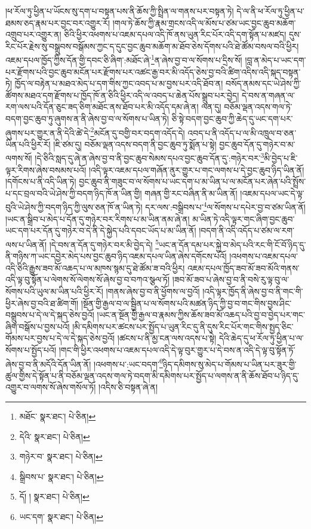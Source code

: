 །ཕ་རོལ་ཏུ་ཕྱིན་པ་ཡོངས་སུ་དག་པ་བསྟན་པས་ནི་ཆོས་ཀྱི་སྤྲིན་ལ་གནས་པར་བསྟན་ཏེ། དེ་ལ་ནི་ཕ་རོལ་ཏུ་ཕྱིན་པ་ཐམས་ཅད་རྣམ་པར་བྱང་བར་འགྱུར་རོ། །གལ་ཏེ་ཆོས་ཀྱི་རྣམ་གྲངས་འདི་ལ་མོས་པ་ཙམ་ཡང་བྱང་ཆུབ་མཆོག་འགྲུབ་པར་འགྱུར་ན། ཅིའི་ཕྱིར་འཕགས་པ་འཇམ་དཔལ་འདི་ཁོ་ནས་ཡུན་རིང་པོར་འདི་དག་སྟོན་པ་མཛད། དུས་རིང་པོར་རྗེས་སུ་བསྒྲུབས་བསྒོམས་ཀྱང་ད་དུང་བྱང་ཆུབ་མཆོག་མ་ཐོབ་ཅེས་དོགས་པའི་ཐེ་ཚོམ་བསལ་བའི་ཕྱིར། འཇམ་དཔལ་ཁྱོད་ཀྱིས་དོན་གྱི་དབང་ཅི་ཞིག་:མཐོང་ཞེ་\footnote{མཐོང་  སྣར་ཐང་།  པེ་ཅིན། }ན་ཞེས་བྱ་བ་ལ་སོགས་པ་དྲིས་སོ། །བླ་ན་མེད་པ་ཡང་དག་པར་རྫོགས་པའི་བྱང་ཆུབ་མངོན་པར་རྫོགས་པར་འཚང་རྒྱ་བར་མི་འདོད་ཅེས་བྱ་བའི་ཚིག་འདིས་འདི་སྐད་བསྟན་ཏེ། ཁྱོད་ལ་བརྟེན་པ་མཐའ་མེད་པ་དག་གིས་ཀྱང་འབད་པ་མ་བྱས་པར་འདི་ཐོབ་ན། བསོད་ནམས་དང་ཡེ་ཤེས་ཀྱི་ཚོགས་མཐའ་དག་རྫོགས་པ་ཁྱོད་ཁོ་ན་ཅིའི་ཕྱིར་འདི་ལ་འབད་པ་ཆེན་པོས་སྒྲུབ་པར་བྱེད། དེ་བས་ན་གཞན་ལ་རག་ལས་པའི་དོན་ཅུང་ཟད་ཅིག་མཐོང་ནས་ཐོབ་པར་མི་འདོད་དམ་ཞེ་ན། ལན་དུ། བཅོམ་ལྡན་འདས་གལ་ཏེ་བདག་བྱང་ཆུབ་ཏུ་ཞུགས་ན་ནི་ཞེས་བྱ་བ་ལ་སོགས་པ་ཡིན་ཏེ། ཅི་སྟེ་བདག་བྱང་ཆུབ་ཀྱི་ཆེད་དུ་ཡང་དག་པར་ཞུགས་པར་གྱུར་ན་ནི་དེའི་ཚེ་དེ་\footnote{དེའི་  སྣར་ཐང་།  པེ་ཅིན། }མངོན་དུ་བགྱི་བར་བདག་འདོད་དེ། འབད་པ་ནི་འདོད་པ་ལ་མི་འཁྲུལ་བ་ཅན་ཡིན་པའི་ཕྱིར་རོ། །ཇི་ཙམ་དུ། བཅོམ་ལྡན་འདས་བདག་ནི་བྱང་ཆུབ་ཏུ་སྨོན་པ་སྟེ། བྱང་ཆུབ་དོན་དུ་གཉེར་བ་མ་ལགས་སོ། །དེ་ཅིའི་སླད་དུ་ཞེ་ན་ཞེས་བྱ་བ་ནི་བྱང་ཆུབ་སེམས་དཔའ་བྱང་ཆུབ་དོན་དུ་:གཉེར་བར་\footnote{གཉེར་བ་  སྣར་ཐང་།  པེ་ཅིན། }མི་བྱེད་པ་ཇི་ལྟར་རིགས་ཞེས་བསམས་པའོ། །འདི་ལྟར་འཇམ་དཔལ་གཞོན་ནུར་གྱུར་པ་གང་ལགས་པ་དེ་བྱང་ཆུབ་ཉིད་ཡིན་ནོ། །དགོངས་པ་ནི་འདི་ཡིན་ཏེ། བྱང་ཆུབ་ནི་གཟུང་བ་ལ་སོགས་པ་ཡང་དག་པ་མ་ཡིན་པ་ལ་མངོན་པར་ཞེན་པའི་སྤྲོས་པ་དང་བྲལ་བའི་ཡེ་ཤེས་ཀྱི་བདག་ཉིད་ཁོ་ན་ཡིན་གྱི། གཞན་གྱི་རང་བཞིན་ནི་མ་ཡིན་ནོ། །འཇམ་དཔལ་ཡང་དེ་ལྟ་བུའི་ཡེ་ཤེས་ཀྱི་བདག་ཉིད་ཀྱི་ལུས་ཅན་ཁོ་ན་ཡིན་ཏེ། དར་ལས་:བསྒྲིབས་པ་\footnote{སྒྲིབས་པ་  སྣར་ཐང་།  པེ་ཅིན། }ལ་སོགས་པ་དཔེར་བྱ་བ་ཙམ་ཡིན་ནོ། །ཡང་ན་སྒྲིབ་པ་མེད་པ་དོན་དུ་གཉེར་བར་རིགས་པ་མ་ཡིན་ནམ་ཞེ་ན། མ་ཡིན་ཏེ་འདི་ལྟར་གང་ཞིག་བྱང་ཆུབ་ཡང་དག་པར་དོན་དུ་གཉེར་བ་དེ་ནི་དེ་སྐྱེད་པའི་དབང་ཡོད་པ་མ་ཡིན་ནོ། །བདག་ནི་འདི་འདོད་པ་ཙམ་ལ་རག་ལས་པ་ཡིན་ནོ། །དེ་བས་ན་དོན་དུ་གཉེར་བར་མི་བྱེད་དེ། \footnote{དོ། །   སྣར་ཐང་།  པེ་ཅིན། }ཡང་ན་དོན་དམ་པར་སྐྱེ་བ་མེད་པའི་རང་གི་ངོ་བོ་ཉིད་དུ་ནི་གཉིས་ཀ་ཡང་དབྱེར་མེད་པས་བྱང་ཆུབ་ཉིད་འཇམ་དཔལ་ཡིན་ཞེས་དགོངས་པའོ། །འཕགས་པ་འཇམ་དཔལ་འདི་ཅིའི་རྒྱུས་ཟབ་མོ་འཆད་པ་ལ་མཁས་སྙམ་དུ་ཐེ་ཚོམ་ཟ་བའི་ཕྱིར། འཇམ་དཔལ་ཁྱོད་ཟབ་མོ་ཟབ་མོའི་གནས་འདི་ལྟ་བུ་སྟོན་པ་ལེགས་སོ་ལེགས་སོ་ཞེས་བྱ་བ་བཀའ་སྩལ་ཏོ། །ཟབ་མོ་ཟབ་པ་ཞེས་བྱ་བ་ནི་བསེ་རུ་ལྟ་བུ་ལ་སོགས་པའི་ཡུལ་མ་ཡིན་པའི་ཕྱིར་རོ། །གནས་ཞེས་བྱ་བ་ནི་ཕྱོགས་ལ་བྱའོ། །འདི་ལྟར་ཁྱོད་ནི་ཞེས་བྱ་བ་ནི་གང་གི་ཕྱིར་ཞེས་བྱ་བའི་ཐ་ཚིག་གོ། །སྔོན་གྱི་རྒྱལ་བ་ལ་སྦྱིན་པ་ལ་སོགས་པའི་མཚན་ཉིད་ཀྱི་བྱ་བ་གང་གིས་བྱས་ཤིང་བསྒྲུབས་པ་དེ་ལ་དེ་སྐད་ཅེས་བྱའོ། །ཡང་ན་སྔོན་གྱི་རྒྱལ་བ་རྣམས་ཀྱིས་ཆོས་ཟབ་མོ་འཆད་པའི་བྱ་བ་བྱེད་པར་གང་ཞིག་བསྒོས་པ་བྱས་པའོ། །མི་དམིགས་པར་ཚངས་པར་སྤྱོད་པ་ཡུན་རིང་དུ་ནི་དུས་རིང་པོར་གང་གིས་སྤྱད་ཅིང་གོམས་པར་བྱས་པ་དེ་ལ་དེ་སྐད་ཅེས་བྱའོ། །ཚངས་པ་ནི་མྱ་ངན་ལས་འདས་པ་སྟེ། དེའི་ཆེད་དུ་ཕ་རོལ་ཏུ་ཕྱིན་པ་ལ་སོགས་པ་སྤྱོད་པའོ། །གང་གི་ཕྱིར་འཕགས་པ་འཇམ་དཔལ་འདི་དེ་ལྟ་བུར་གྱུར་པ་དེ་བས་ན་འདི་དེ་ལྟ་བུ་སྟོན་ཏོ་ཞེས་བྱ་བ་ནི་མདོའི་དོན་ཡིན་ནོ། །འཕགས་པ་:ཡང་བདག་\footnote{ཡང་དག་  སྣར་ཐང་།  པེ་ཅིན། }ཉིད་དམིགས་སུ་མེད་པ་གོམས་པ་ཡིན་པར་ཟུར་གྱི་ཚུལ་གྱིས་དེ་སྟོན་པ་ནི་བཅོམ་ལྡན་འདས་གལ་ཏེ་བདག་མི་དམིགས་པར་སྤྱོད་པ་ལགས་ན་ནི་ཆོས་ཐོབ་པ་ཉིད་དུ་འགྱུར་བ་ལགས་སོ་ཞེས་གསོལ་ཏོ། །འདིས་ཅི་བསྟན་ཞེ་ན། 